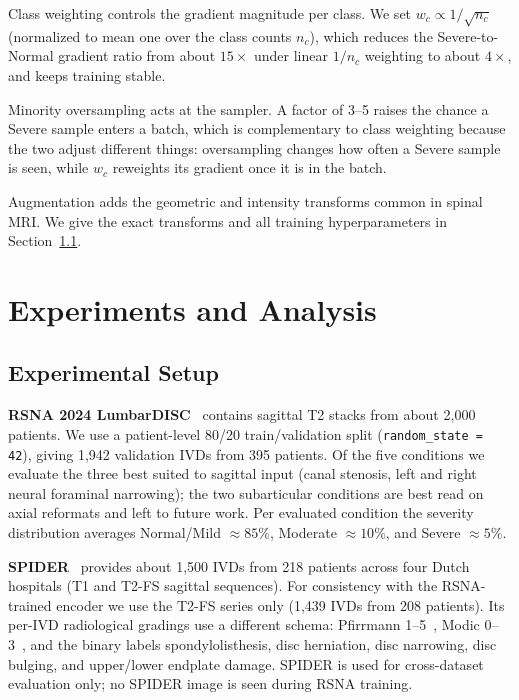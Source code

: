 \documentclass[runningheads]{llncs}
\begin{document}
Class weighting controls the gradient magnitude per class. We set $w_c \propto 1/\sqrt{n_c}$ (normalized to mean one over the class counts $n_c$), which reduces the Severe-to-Normal gradient ratio from about $15\times$ under linear $1/n_c$ weighting to about $4\times$, and keeps training stable.

Minority oversampling acts at the sampler. A factor of 3--5 raises the chance a Severe sample enters a batch, which is complementary to class weighting because the two adjust different things: oversampling changes how often a Severe sample is seen, while $w_c$ reweights its gradient once it is in the batch.

Augmentation adds the geometric and intensity transforms common in spinal MRI. We give the exact transforms and all training hyperparameters in Section~\ref{exp1}.

\section{Experiments and Analysis}\label{sec4}

\subsection{Experimental Setup}\label{exp1}

\textbf{RSNA 2024 LumbarDISC}~\cite{kaggle2024} contains sagittal T2 stacks from about 2{,}000 patients. We use a patient-level 80/20 train/validation split (\verb|random_state = 42|), giving 1{,}942 validation IVDs from 395 patients. Of the five conditions we evaluate the three best suited to sagittal input (canal stenosis, left and right neural foraminal narrowing); the two subarticular conditions are best read on axial reformats and left to future work. Per evaluated condition the severity distribution averages Normal/Mild $\approx 85\%$, Moderate $\approx 10\%$, and Severe $\approx 5\%$.

\textbf{SPIDER}~\cite{vandergraaf2024spider} provides about 1{,}500 IVDs from 218 patients across four Dutch hospitals (T1 and T2-FS sagittal sequences). For consistency with the RSNA-trained encoder we use the T2-FS series only (1{,}439 IVDs from 208 patients). Its per-IVD radiological gradings use a different schema: Pfirrmann 1--5~\cite{pfirrmann2001}, Modic 0--3~\cite{modic1988}, and the binary labels spondylolisthesis, disc herniation, disc narrowing, disc bulging, and upper/lower endplate damage. SPIDER is used for cross-dataset evaluation only; no SPIDER image is seen during RSNA training.
\end{document}
